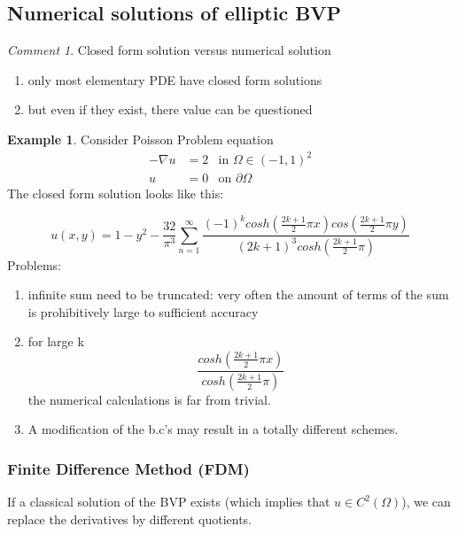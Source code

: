 \documentclass[english]{article}
\theoremstyle{definition}
\newtheorem*{exa}{Example}
\theoremstyle{remark}
\newtheorem*{comm}{Comment}
\newcommand{\f}[2]{\frac{#1}{#2}}							%
\newcommand{\p}{\partial}
\newcommand{\OO}{\Omega}
\newcommand{\tri}{\nabla}
\newcommand{\tx}[1]{\text{#1}}
\begin{document}
\subsection{Numerical solutions of elliptic BVP}
\begin{comm}
  Closed form solution versus numerical solution
  \begin{enumerate}
  \item only most elementary PDE have closed form solutions
  \item but even if they exist, there value can be questioned
  \end{enumerate}
\end{comm}
\begin{exa}
  Consider Poisson Problem equation\\
  \begin{align*}
    -\tri u &= 2 & \tx{in }\OO\in (-1,1)^2\\
    u&=0 & \tx{on }\p\OO
  \end{align*}
  The closed form solution looks like this:

  $$u(x,y) = 1 - y^2 -\f{32}{\pi^3} \sum_{n=1}^\infty \f{(-1)^k cosh(\f{2k+1}{2}\pi x) cos(\f{2k+1}{2}\pi y)}{(2k+1)^3cosh(\f{2k+1}{2}\pi)}$$
  Problems:
  \begin{enumerate}
  \item infinite sum need to be truncated: very often the amount of terms of the sum is prohibitively large to sufficient accuracy
  \item for large k $$\f{cosh(\f{2k+1}{2}\pi x)}{cosh(\f{2k+1}{2}\pi)}$$
    the numerical calculations is far from trivial.
  \item A modification of the b.c's may result in a totally different schemes.
    
  \end{enumerate}
\end{exa}
\subsubsection{Finite Difference Method (FDM)}
If a classical solution of the BVP exists (which implies that $u\in C^2(\OO)$), we can replace the derivatives by different quotients.\\
\end{document}
